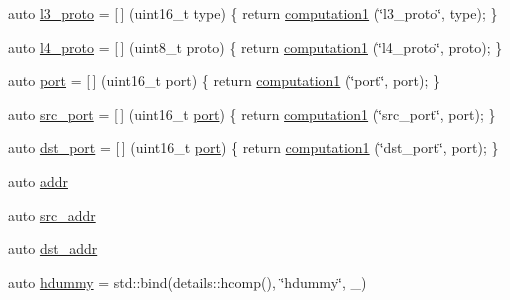 \begin{DoxyCompactItemize}
\item 
auto \hyperlink{namespacepfq__lang_1_1anonymous__namespace_02default_8hpp_03_aed01dd5380a873d92397ec0d4c07abac}{l3\-\_\-proto} = \mbox{[}$\,$\mbox{]} (uint16\-\_\-t type) \{ return \hyperlink{namespacepfq__lang_a58e7e358fc7c95121f74d56c094b1627}{computation1} (\char`\"{}l3\-\_\-proto\char`\"{}, type); \}
\item 
auto \hyperlink{namespacepfq__lang_1_1anonymous__namespace_02default_8hpp_03_a75da77904f1cff4cc42fc3a081f80670}{l4\-\_\-proto} = \mbox{[}$\,$\mbox{]} (uint8\-\_\-t proto) \{ return \hyperlink{namespacepfq__lang_a58e7e358fc7c95121f74d56c094b1627}{computation1} (\char`\"{}l4\-\_\-proto\char`\"{}, proto); \}
\item 
auto \hyperlink{namespacepfq__lang_1_1anonymous__namespace_02default_8hpp_03_a1b370b44e5eedc364f3bb306d5042738}{port} = \mbox{[}$\,$\mbox{]} (uint16\-\_\-t port) \{ return \hyperlink{namespacepfq__lang_a58e7e358fc7c95121f74d56c094b1627}{computation1} (\char`\"{}port\char`\"{}, port); \}
\item 
auto \hyperlink{namespacepfq__lang_1_1anonymous__namespace_02default_8hpp_03_ad4d03d1e69ba9608a2d87ac91a2b521f}{src\-\_\-port} = \mbox{[}$\,$\mbox{]} (uint16\-\_\-t \hyperlink{namespacepfq__lang_1_1anonymous__namespace_02default_8hpp_03_a1b370b44e5eedc364f3bb306d5042738}{port}) \{ return \hyperlink{namespacepfq__lang_a58e7e358fc7c95121f74d56c094b1627}{computation1} (\char`\"{}src\-\_\-port\char`\"{}, port); \}
\item 
auto \hyperlink{namespacepfq__lang_1_1anonymous__namespace_02default_8hpp_03_aceccbe6ec912638fb8d5d3d9e0372a09}{dst\-\_\-port} = \mbox{[}$\,$\mbox{]} (uint16\-\_\-t \hyperlink{namespacepfq__lang_1_1anonymous__namespace_02default_8hpp_03_a1b370b44e5eedc364f3bb306d5042738}{port}) \{ return \hyperlink{namespacepfq__lang_a58e7e358fc7c95121f74d56c094b1627}{computation1} (\char`\"{}dst\-\_\-port\char`\"{}, port); \}
\item 
auto \hyperlink{namespacepfq__lang_1_1anonymous__namespace_02default_8hpp_03_aafce8334d1be83bff9a2115439c8c453}{addr}
\item 
auto \hyperlink{namespacepfq__lang_1_1anonymous__namespace_02default_8hpp_03_a63c87ff605d7cefa807fd61bc463785d}{src\-\_\-addr}
\item 
auto \hyperlink{namespacepfq__lang_1_1anonymous__namespace_02default_8hpp_03_a4b72bac7c3af312ffe7c670eb2583f9a}{dst\-\_\-addr}
\item 
auto \hyperlink{namespacepfq__lang_1_1anonymous__namespace_02default_8hpp_03_a4e7cf4874b42c5722f420fc54f360242}{hdummy} = std\-::bind(details\-::hcomp(), \char`\"{}hdummy\char`\"{}, \-\_)

\end{DoxyCompactItemize}
